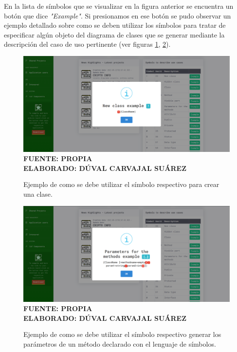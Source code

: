 En la lista de símbolos que se visualizar en la figura anterior se encuentra un botón que dice \textit{"Example"}. Si presionamos en ese botón se pudo observar un ejemplo detallado sobre como se deben utilizar los símbolos para tratar de especificar algún objeto del diagrama de clases que se generar mediante la descripción del caso de uso pertinente (ver figuras \ref{fig:ejemploclase}, \ref{fig:ejemploparametro}).

\begin{figure}[H]
	\caption{Ejemplo de como se debe utilizar el símbolo respectivo para crear una clase.}
	\includegraphics[width=14cm]{img/res_002.png}
	\label{fig:ejemploclase}
	\textbf{\\ FUENTE: PROPIA \\ ELABORADO: DÚVAL CARVAJAL SUÁREZ}
\end{figure}

\begin{figure}[H]
	\caption{Ejemplo de como se debe utilizar el símbolo respectivo generar los parámetros de un método declarado con el lenguaje de símbolos.}
	\includegraphics[width=14cm]{img/res_003.png}
	\label{fig:ejemploparametro}
	\textbf{\\ FUENTE: PROPIA \\ ELABORADO: DÚVAL CARVAJAL SUÁREZ}
\end{figure}

